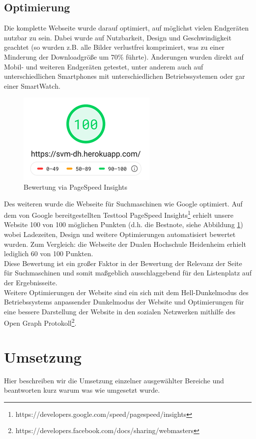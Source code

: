 \documentclass[12pt,a4paper]{article}
\begin{document}
\subsection{Optimierung}
Die komplette Webseite wurde darauf optimiert, auf möglichst vielen Endgeräten nutzbar zu sein. Dabei wurde auf Nutzbarkeit, Design und Geschwindigkeit geachtet (so wurden z.B. alle Bilder verlustfrei komprimiert, was zu einer Minderung der Downloadgröße um 70\% führte). Änderungen wurden direkt auf Mobil- und weiteren Endgeräten getestet, unter anderem auch auf unterschiedlichen Smartphones mit unterschiedlichen Betriebssystemen oder gar einer SmartWatch.
\begin{figure}[!htbp]
\centering
	\includegraphics[scale=1]{Bewertung.png}
	\caption{Bewertung via PageSpeed Insights}
	\label{img:Bewertung}
\end{figure}
Des weiteren wurde die Webseite für Suchmaschinen wie Google optimiert. Auf dem von Google bereitgestellten Testtool \dq PageSpeed Insights\dq \footnote{\label{foot:4} https://developers.google.com/speed/pagespeed/insights} erhielt unsere Website 100 von 100 möglichen Punkten (d.h. die Bestnote, siehe Abbildung \ref{img:Bewertung}) wobei Ladezeiten, Design und weitere Optimierungen automatisiert bewertet wurden. Zum Vergleich: die Webseite der Dualen Hochschule Heidenheim erhielt lediglich 60 von 100 Punkten. \\
Diese Bewertung ist ein großer Faktor in der Bewertung der Relevanz der Seite für Suchmaschinen und somit maßgeblich ausschlaggebend für den Listenplatz auf der Ergebnisseite. \\
Weitere Optimierungen der Website sind ein sich mit dem Hell-\/Dunkelmodus des Betriebssystems anpassender Dunkelmodus der Website und Optimierungen für eine bessere Darstellung der Website in den sozialen Netzwerken mithilfe des Open Graph Protokoll\footnote{\label{foot:5} https://developers.facebook.com/docs/sharing/webmasters}.

\section{Umsetzung}
Hier beschreiben wir die Umsetzung einzelner ausgewählter Bereiche und beantworten kurz warum was wie umgesetzt wurde.
\end{document}
